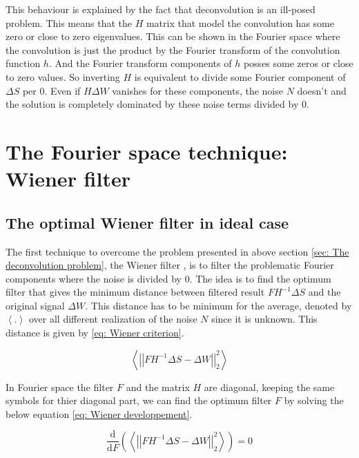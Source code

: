 This behaviour is explained by the fact that deconvolution is an ill-posed problem. This means that the $H$ matrix that model the convolution has some zero or close to zero eigenvalues. This can be shown in the Fourier space where the convolution is just the product by the Fourier transform of the convolution function $h$. And the Fourier transform components of $h$ posses some zeros or close to zero values. So inverting $H$ is equivalent to divide some Fourier component of $\Delta S$ per 0. Even if $H\Delta W$ vanishes for these components, the noise $N$ doesn't and the solution is completely dominated by these noise terms divided by 0.

\section{\texorpdfstring{The Fourier space technique: Wiener filter}{The Fourier space technique: Wiener filter}\label{sec: Wiener filter}}


\subsection{\texorpdfstring{The optimal Wiener filter in ideal case}{The optimal Wiener filter in ideal case}}

The first technique to overcome the problem presented in above section \ref{sec: The deconvolution problem}, the Wiener filter \cite{wiener1949extrapolation}, is to filter the problematic Fourier components where the noise is divided by 0. The idea is to find the optimum filter that  gives the minimum distance between filtered result $FH^{-1}\Delta S$ and the original signal $\Delta W$. This distance has to be minimum for the average, denoted by $\left<.\right>$ over all different realization of the noise $N$ since it is unknown. This distance is given by \eqref{eq: Wiener criterion}.

\begin{equation}
	\left<\left|\left| FH^{-1}\Delta S - \Delta W \right|\right|_{2}^{2}\right> \label{eq: Wiener criterion}
\end{equation}

In Fourier space the filter $F$ and the matrix $H$ are diagonal, keeping the same symbols for thier diagonal part, we can find the optimum filter $F$ by solving the below equation \eqref{eq: Wiener developpement}.

\begin{equation}
	\frac{\mathrm{d}}{\mathrm{d}F}\left( \left<\left|\left| FH^{-1}\Delta S - \Delta W \right|\right|_{2}^{2}\right> \right) = 0 \label{eq: Wiener developpement}
\end{equation}

